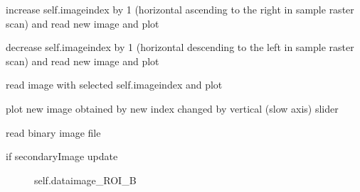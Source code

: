 \documentclass[letterpaper,10pt,english]{sphinxmanual}
\begin{document}
\begin{fulllineitems}
\begin{fulllineitems}
\label{\detokenize{PeakSearchGUI:LaueTools.GUI.PeakSearchGUI.MainPeakSearchFrame.OnPlus}}
increase  self.imageindex by 1 (horizontal ascending to the right in sample raster scan)
and read new image and plot

\end{fulllineitems}


\begin{fulllineitems}
\label{\detokenize{PeakSearchGUI:LaueTools.GUI.PeakSearchGUI.MainPeakSearchFrame.OnMinus}}
decrease  self.imageindex by 1 (horizontal descending to the left in sample raster scan)
and read new image and plot

\end{fulllineitems}


\begin{fulllineitems}
\label{\detokenize{PeakSearchGUI:LaueTools.GUI.PeakSearchGUI.MainPeakSearchFrame.OnGoto}}
read image with selected self.imageindex and plot

\end{fulllineitems}


\begin{fulllineitems}
\label{\detokenize{PeakSearchGUI:LaueTools.GUI.PeakSearchGUI.MainPeakSearchFrame.onChangeIndex_slider_imagevert}}
plot new image obtained by new index changed by vertical (slow axis) slider

\end{fulllineitems}


\begin{fulllineitems}
\label{\detokenize{PeakSearchGUI:LaueTools.GUI.PeakSearchGUI.MainPeakSearchFrame.read_data}}
read binary image file
\begin{description}
\item[{if secondaryImage update}] \leavevmode
self.dataimage\_ROI\_B


\end{description}
\end{fulllineitems}
\end{fulllineitems}
\end{document}
